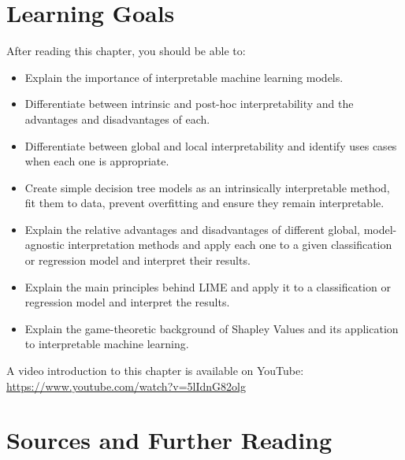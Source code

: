 %
%
\section*{Learning Goals}

After reading this chapter, you should be able to:
\begin{itemize}
    \item Explain the importance of interpretable machine learning models.
    \item Differentiate between intrinsic and post-hoc interpretability and the advantages and disadvantages of each.
    \item Differentiate between global and local interpretability and identify uses cases when each one is appropriate.
    \item Create simple decision tree models as an intrinsically interpretable method, fit them to data, prevent overfitting and ensure they remain interpretable.
    \item Explain the relative advantages and disadvantages of different global, model-agnostic interpretation methods and apply each one to a given classification or regression model and interpret their results. 
    \item Explain the main principles behind LIME and apply it to a 	classification or regression model and interpret the results. 
    \item Explain the game-theoretic background of Shapley Values and its application to interpretable machine learning. 
\end{itemize}

\begin{advanced}
\begin{videobox}
A video introduction to this chapter is available on YouTube:\\

\url{https://www.youtube.com/watch?v=5lIdnG82olg}
\end{videobox}
\end{advanced}

\section*{Sources and Further Reading}


